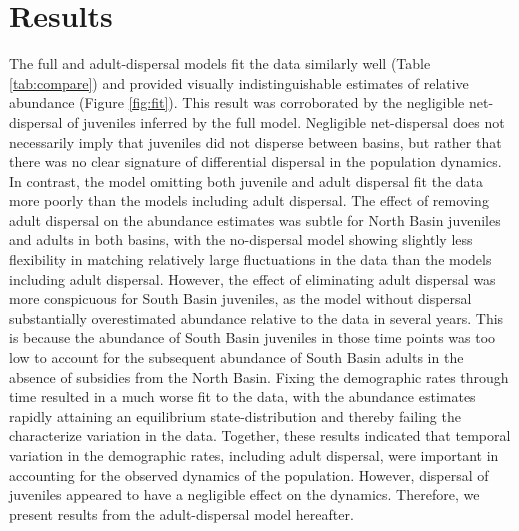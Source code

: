 \documentclass[11pt]{article}
\begin{document}

\section*{Results}

The full and adult-dispersal models fit the data similarly well (Table \ref{tab:compare})
and provided visually indistinguishable estimates of
relative abundance (Figure \ref{fig:fit}).
This result was corroborated by the negligible net-dispersal
of juveniles inferred by the full model.
Negligible net-dispersal does not necessarily imply
that juveniles did not disperse between basins,
but rather that there was no clear signature of differential dispersal
in the population dynamics.
In contrast, the model omitting both juvenile and adult dispersal fit
the data more poorly than the models including adult dispersal.
The effect of removing adult dispersal on the abundance estimates was subtle
for North Basin juveniles and adults in both basins,
with the no-dispersal model showing slightly less flexibility in matching
relatively large fluctuations in the data than the models including adult dispersal.
However,
the effect of eliminating adult dispersal was more conspicuous for South Basin juveniles,
as the model without dispersal substantially overestimated abundance relative to the data
in several years.
This is because the abundance of South Basin juveniles in those time points was too low
to account for the subsequent abundance of South Basin adults
in the absence of subsidies from the North Basin.
Fixing the demographic rates through time resulted in a much worse fit to the data,
with the abundance estimates rapidly attaining an equilibrium state-distribution
and thereby failing the characterize variation in the data.
Together, these results indicated that temporal variation in the demographic rates,
including adult dispersal, were important in accounting
for the observed dynamics of the population.
However, dispersal of juveniles appeared to have a negligible effect on the dynamics.
Therefore, we present results from the adult-dispersal model hereafter.
\end{document}

